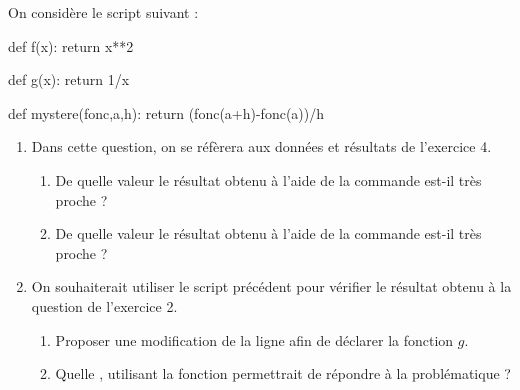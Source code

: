 \documentclass[a4paper,11pt]{article}
\begin{document}
\medskip


\medskip

On considère le script \calgpython{} suivant :

\begin{envpython}[10cm]
def f(x):
	return x**2

def g(x):
	return 1/x

def mystere(fonc,a,h):
	return (fonc(a+h)-fonc(a))/h
\end{envpython}

\begin{enumerate}
	\item Dans cette question, on se réfèrera aux données et résultats de l'\textcolor{titrebleu}{exercice 4}.
	\begin{enumerate}
		\item De quelle valeur le résultat obtenu à l'aide de la commande  est-il très proche ?
		\item De quelle valeur le résultat obtenu à l'aide de la commande  est-il très proche ?
	\end{enumerate}
	\item On souhaiterait utiliser le script précédent pour vérifier le résultat obtenu à la question  de l'\textcolor{titrebleu}{exercice 2}.
	\begin{enumerate}
		\item Proposer une modification de la ligne  afin de déclarer la fonction $g$.
		\item Quelle , utilisant la fonction  permettrait de répondre à la problématique ?
	\end{enumerate}
\end{enumerate}
\end{document}
